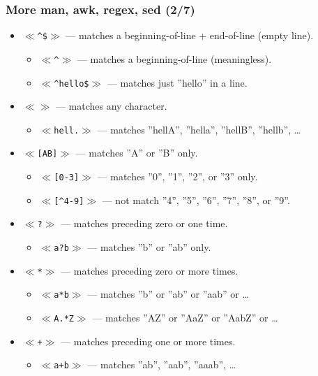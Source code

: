\documentclass[aspectratio=169, xcolor=table, notheorems, hyperref={pdfpagelabels=false}]{beamer}
\begin{document}
\begin{frame}[fragile]
\frametitle{More man, awk, regex, sed (2/7)}
\begin{itemize}
\item $\ll$\texttt{\^{}\${}}$\gg$ --- matches a beginning-of-line + end-of-line (empty line).
\begin{itemize}
\item $\ll$\texttt{\^{}}$\gg$ --- matches a beginning-of-line (meaningless).
\item $\ll$\texttt{\^{}hello\${}}$\gg$ --- matches just ''hello'' in a line.
\end{itemize}
\item $\ll${\tiny{}\textbullet}$\gg$ --- matches any character.
\begin{itemize}
\item $\ll$\texttt{hell.}$\gg$ --- matches ''hellA'', ''hella'', ''hellB'', ''hellb'', \ldots
\end{itemize}
\item $\ll$\texttt{[AB]}$\gg$ --- matches ''A'' or ''B'' only.
\begin{itemize}
\item $\ll$\texttt{[0-3]}$\gg$ --- matches ''0'', ''1'', ''2'', or ''3'' only.
\item $\ll$\texttt{[\^{}4-9]}$\gg$ --- not match ''4'', ''5'', ''6'', ''7'', ''8'', or ''9''.
\end{itemize}
\item $\ll$\texttt{?}$\gg$ --- matches preceding zero or one time.
\begin{itemize}
\item $\ll$\texttt{a?b}$\gg$ --- matches ''b'' or ''ab'' only.
\end{itemize}
\item $\ll$\texttt{*}$\gg$ --- matches preceding zero or more times.
\begin{itemize}
\item $\ll$\texttt{a*b}$\gg$ --- matches ''b'' or ''ab'' or ''aab'' or \ldots
\item $\ll$\texttt{A.*Z}$\gg$ --- matches ''AZ'' or ''AaZ'' or ''AabZ'' or \ldots
\end{itemize}
\item $\ll$\texttt{+}$\gg$ --- matches preceding one or more times.
\begin{itemize}
\item $\ll$\texttt{a+b}$\gg$ --- matches ''ab'', ''aab'', ''aaab'', \ldots
\end{itemize}
\end{itemize}
\end{frame}
\end{document}
